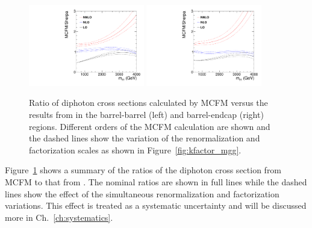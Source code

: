 \begin{figure}[tbp!]
\begin{center}
\includegraphics[angle=0,width=0.45\textwidth]{fig/kfactor_comparison_BB_125GeV_NNPDF.pdf}
\includegraphics[angle=0,width=0.45\textwidth]{fig/kfactor_comparison_BE_125GeV_NNPDF.pdf}
\end{center}
\caption{Ratio of diphoton cross sections calculated by MCFM versus the results from \SHERPA in the barrel-barrel (left) and barrel-endcap (right) regions. Different orders of the MCFM calculation are shown and the dashed lines show the variation of the renormalization and factorization scales as shown in Figure~\ref{fig:kfactor_mgg}.
}
\label{fig:kfactor_comparison}
\end{figure}

Figure~\ref{fig:kfactor_comparison} shows a summary of the ratios of the diphoton cross section from MCFM to that from \SHERPA. The nominal ratios are shown in full lines while the dashed lines show the effect of the simultaneous renormalization and factorization variations. This effect is treated as a systematic uncertainty and will be discussed more in Ch.~\ref{ch:systematics}.

